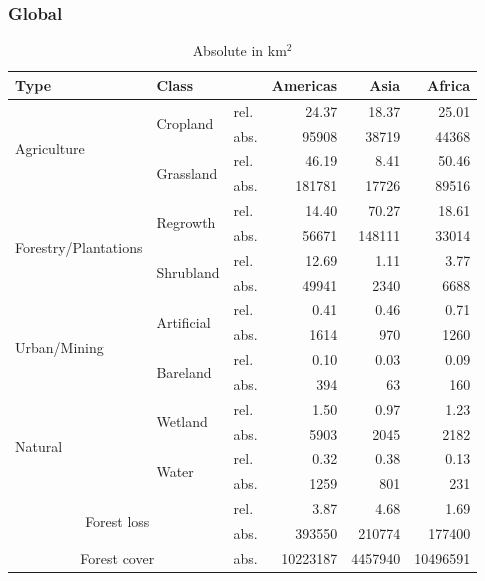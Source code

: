         \subsubsection{Global}
        	\begin{table}[ht]
		        \centering
		        \caption[Deforestation driver]{Absolute in km$^2$}
		        \label{tab:driver_tab}
		        \begin{tabular}{lllrrr}
			        Type & Class & & Americas & Asia & Africa \\\hline
			        \multirow{4}{*}{Agriculture} & \multirow{2}{*}{Cropland} & rel. & 24.37 & 18.37 & 25.01 \\
			        & & abs. & 95908 & 38719 & 44368 \\
			        & \multirow{2}{*}{Grassland} & rel. & 46.19 & 8.41 & 50.46 \\
			        & & abs. & 181781 & 17726 & 89516 \\
			        \multirow{4}{*}{Forestry/Plantations} & \multirow{2}{*}{Regrowth} & rel. & 14.40 & 70.27 & 18.61 \\
			        & & abs. & 56671 & 148111 & 33014 \\
			        & \multirow{2}{*}{Shrubland} & rel. & 12.69 & 1.11 & 3.77 \\
			        & & abs. & 49941 & 2340 & 6688 \\
			        \multirow{4}{*}{Urban/Mining} & \multirow{2}{*}{Artificial} & rel. & 0.41 & 0.46 & 0.71 \\
			        & & abs. & 1614 & 970 & 1260 \\
			        & \multirow{2}{*}{Bareland} & rel. & 0.10 & 0.03 & 0.09 \\
			        & & abs. & 394 & 63 & 160 \\
			        \multirow{4}{*}{Natural} & \multirow{2}{*}{Wetland} & rel. & 1.50 & 0.97 & 1.23 \\
			        & & abs. & 5903 & 2045 & 2182 \\
			        & \multirow{2}{*}{Water} & rel. & 0.32 & 0.38 & 0.13 \\
			        & & abs. & 1259 & 801 & 231 \\\hline
			        \multicolumn{2}{c}{\multirow{2}{*}{Forest loss}} & rel. & 3.87 & 4.68 & 1.69 \\
			        & & abs. & 393550 & 210774 & 177400 \\
			        \multicolumn{2}{c}{Forest cover} & abs. & 10223187 & 4457940 & 10496591 \\\hline
		        \end{tabular}
	        \end{table}
        
